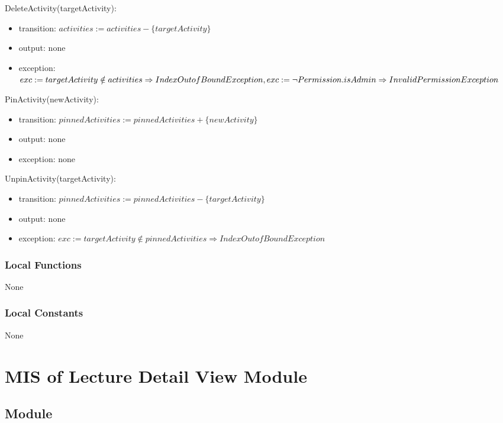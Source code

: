 \documentclass[12pt, titlepage]{article}
\begin{document}
\noindent DeleteActivity(targetActivity):
\begin{itemize}
\item transition: $activities := activities - \{targetActivity\}$
\item output: none
\item exception: $exc := targetActivity \notin activities \Rightarrow IndexOutofBound Exception,\\
                  exc := \neg Permission.isAdmin \Rightarrow InvalidPermission Exception$
\end{itemize}

\noindent PinActivity(newActivity):
\begin{itemize}
\item transition: $pinnedActivities := pinnedActivities + \{newActivity\}$
\item output: none
\item exception: none
\end{itemize}

\noindent UnpinActivity(targetActivity):
\begin{itemize}
\item transition: $pinnedActivities := pinnedActivities - \{targetActivity\}$
\item output: none
\item exception: $exc := targetActivity \notin pinnedActivities \Rightarrow IndexOutofBound Exception$
\end{itemize}

\subsubsection{Local Functions}

None

\subsubsection{Local Constants}

None

\newpage

\section{MIS of Lecture Detail View Module} \label{mLDV}

\subsection{Module}
\end{document}
